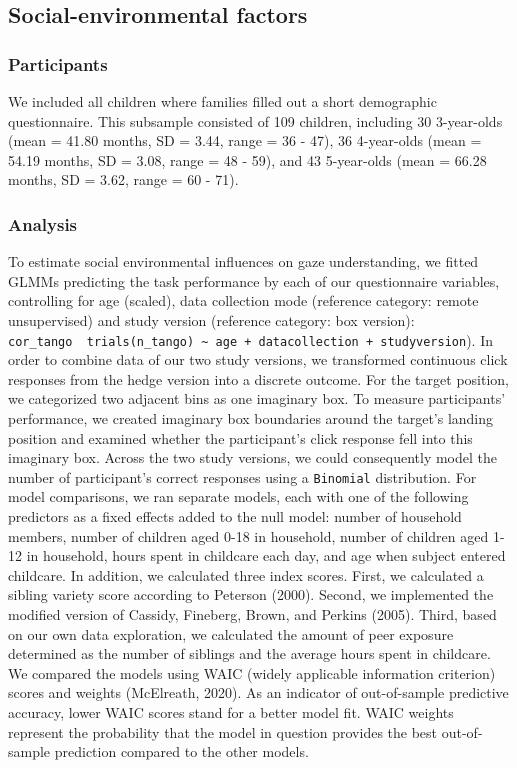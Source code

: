 \documentclass[
  man,floatsintext]{apa6}
\begin{document}
\hypertarget{social-environmental-factors}{%
\subsection{Social-environmental factors}\label{social-environmental-factors}}

\hypertarget{participants}{%
\subsubsection{Participants}\label{participants}}

We included all children where families filled out a short demographic questionnaire. This subsample consisted of 109 children, including 30 3-year-olds (mean = 41.80 months, SD = 3.44, range = 36 - 47),
36 4-year-olds (mean = 54.19 months, SD = 3.08, range = 48 - 59), and
43 5-year-olds (mean = 66.28 months, SD = 3.62, range = 60 - 71).

\hypertarget{analysis}{%
\subsubsection{Analysis}\label{analysis}}

To estimate social environmental influences on gaze understanding, we fitted GLMMs predicting the task performance by each of our questionnaire variables, controlling for age (scaled), data collection mode (reference category: remote unsupervised) and study version (reference category: box version): \texttt{cor\_tango\ \textbar{}\ trials(n\_tango)\ \textasciitilde{}\ age\ +\ datacollection\ +\ studyversion}).
In order to combine data of our two study versions, we transformed continuous click responses from the hedge version into a discrete outcome.
For the target position, we categorized two adjacent bins as one imaginary box.
To measure participants' performance, we created imaginary box boundaries around the target's landing position and examined whether the participant's click response fell into this imaginary box.
Across the two study versions, we could consequently model the number of participant's correct responses using a \texttt{Binomial} distribution.
For model comparisons, we ran separate models, each with one of the following predictors as a fixed effects added to the null model: number of household members, number of children aged 0-18 in household, number of children aged 1-12 in household, hours spent in childcare each day, and age when subject entered childcare.
In addition, we calculated three index scores.
First, we calculated a sibling variety score according to Peterson (2000).
Second, we implemented the modified version of Cassidy, Fineberg, Brown, and Perkins (2005).
Third, based on our own data exploration, we calculated the amount of peer exposure determined as the number of siblings and the average hours spent in childcare.
We compared the models using WAIC (widely applicable information criterion) scores and weights (McElreath, 2020).
As an indicator of out-of-sample predictive accuracy, lower WAIC scores stand for a better model fit.
WAIC weights represent the probability that the model in question provides the best out-of-sample prediction compared to the other models.
\end{document}
